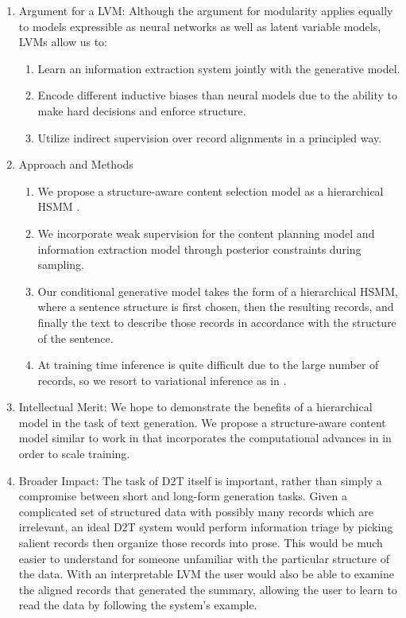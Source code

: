 \documentclass[11pt]{article}
\begin{document}
\begin{enumerate}
\item Argument for a LVM:
Although the argument for modularity applies equally to models expressible as
neural networks as well as latent variable models, LVMs allow us to:
\begin{enumerate}
\item Learn an information extraction system jointly with the generative model.
\item Encode different inductive biases than neural models due to the ability to make hard decisions
and enforce structure.
\item Utilize indirect supervision over record alignments in a principled way.
\end{enumerate}
\item Approach and Methods
\begin{enumerate}
\item We propose a structure-aware content selection \citep{sauper2009wiki} model
as a hierarchical HSMM \citep{wiseman2018template}.
\item We incorporate weak supervision for the content planning model and
information extraction model through posterior constraints during sampling.
\item Our conditional generative model takes the form of a hierarchical
HSMM, where a sentence structure is first chosen, then the resulting records, and finally
the text to describe those records in accordance with the structure of the sentence.
\item At training time inference is quite difficult due to the large number of records,
so we resort to variational inference as in \citep{deng2018vattn}. 
\end{enumerate}
\item Intellectual Merit:
We hope to demonstrate the benefits of a hierarchical model in the task of text generation.
We propose a structure-aware content model similar to
work in \citep{sauper2009wiki,wiseman2017d2t,liang2009semalign}
that incorporates the computational advances in \citep{deng2018vattn}
in order to scale training.
\item Broader Impact:
The task of D2T itself is important, rather than simply a compromise between
short and long-form generation tasks.
Given a complicated set of structured data with possibly many records
which are irrelevant, an ideal D2T system would perform information triage by 
picking salient records then organize those records into prose.
This would be much easier to understand for someone unfamiliar with the
particular structure of the data.
With an interpretable LVM the user would also be able to examine the aligned
records that generated the summary, allowing the user to learn to read
the data by following the system's example.
\end{enumerate}



\end{document}
